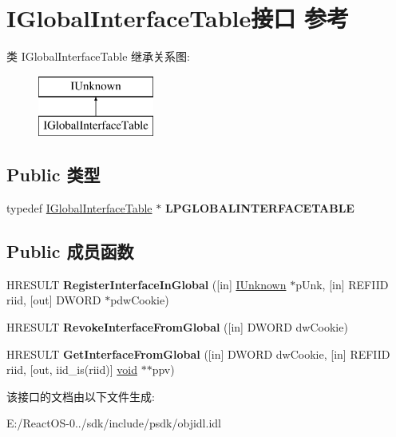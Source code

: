\hypertarget{interface_i_global_interface_table}{}\section{I\+Global\+Interface\+Table接口 参考}
\label{interface_i_global_interface_table}
类 I\+Global\+Interface\+Table 继承关系图\+:\begin{figure}[H]
\begin{center}
\leavevmode
\includegraphics[height=2.000000cm]{interface_i_global_interface_table}
\end{center}
\end{figure}
\subsection*{Public 类型}
\begin{DoxyCompactItemize}
\item 
\mbox{\label{interface_i_global_interface_table_a69edbb69aa78b014fa1e938e621342db}} 
typedef \hyperlink{interface_i_global_interface_table}{I\+Global\+Interface\+Table} $\ast$ {\bfseries L\+P\+G\+L\+O\+B\+A\+L\+I\+N\+T\+E\+R\+F\+A\+C\+E\+T\+A\+B\+LE}
\end{DoxyCompactItemize}
\subsection*{Public 成员函数}
\begin{DoxyCompactItemize}
\item 
\mbox{\label{interface_i_global_interface_table_ad12b3e0bd2308b84352dfe3265e952b3}} 
H\+R\+E\+S\+U\+LT {\bfseries Register\+Interface\+In\+Global} (\mbox{[}in\mbox{]} \hyperlink{interface_i_unknown}{I\+Unknown} $\ast$p\+Unk, \mbox{[}in\mbox{]} R\+E\+F\+I\+ID riid, \mbox{[}out\mbox{]} D\+W\+O\+RD $\ast$pdw\+Cookie)
\item 
\mbox{\label{interface_i_global_interface_table_a7f47cff0dd101672dbba9d9b3a6e165c}} 
H\+R\+E\+S\+U\+LT {\bfseries Revoke\+Interface\+From\+Global} (\mbox{[}in\mbox{]} D\+W\+O\+RD dw\+Cookie)
\item 
\mbox{\label{interface_i_global_interface_table_afb0540c1469d3a1058ccadb001699bb1}} 
H\+R\+E\+S\+U\+LT {\bfseries Get\+Interface\+From\+Global} (\mbox{[}in\mbox{]} D\+W\+O\+RD dw\+Cookie, \mbox{[}in\mbox{]} R\+E\+F\+I\+ID riid, \mbox{[}out, iid\+\_\+is(riid)\mbox{]} \hyperlink{interfacevoid}{void} $\ast$$\ast$ppv)
\end{DoxyCompactItemize}


该接口的文档由以下文件生成\+:\begin{DoxyCompactItemize}
\item 
E\+:/\+React\+O\+S-\/0../sdk/include/psdk/objidl.\+idl\end{DoxyCompactItemize}

